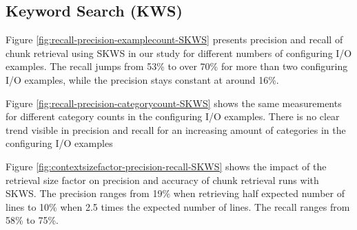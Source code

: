 \documentclass[\myrootdir/main.tex]{subfiles}
\begin{document}
\subsection{Keyword Search (KWS)}
Figure \ref{fig:recall-precision-examplecount-SKWS} presents precision and recall of chunk retrieval using SKWS in our study for different numbers of configuring I/O examples.
The recall jumps from 53\% to over 70\% for more than two configuring I/O examples, while the precision stays constant at around 16\%.

Figure \ref{fig:recall-precision-categorycount-SKWS} shows the same measurements for different category counts in the configuring I/O examples.
There is no clear trend visible in precision and recall for an increasing amount of categories in the configuring I/O examples

Figure \ref{fig:contextsizefactor-precision-recall-SKWS} shows the impact of the retrieval size factor on precision and accuracy of chunk retrieval runs with SKWS.
The precision ranges from 19\% when retrieving half expected number of lines to 10\% when 2.5 times the expected number of lines.
The recall ranges from 58\% to 75\%.
\end{document}
